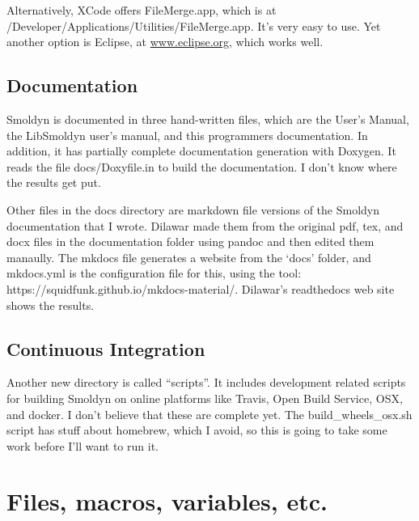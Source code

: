\documentclass {book}
\begin{document}
Alternatively, XCode offers FileMerge.app, which is at /Developer/Applications/Utilities/FileMerge.app. It's very easy to use. Yet another option is Eclipse, at \url{www.eclipse.org}, which works well.

\section{Documentation}

Smoldyn is documented in three hand-written files, which are the User's Manual, the LibSmoldyn user's manual, and this programmers documentation. In addition, it has partially complete documentation generation with Doxygen. It reads the file docs/Doxyfile.in to build the documentation. I don't know where the results get put.

Other files in the docs directory are markdown file versions of the Smoldyn documentation that I wrote. Dilawar made them from the original pdf, tex, and docx files in the documentation folder using pandoc and then edited them manaully. The mkdocs file generates a website from the `docs' folder, and mkdocs.yml is the configuration file for this, using the tool: https://squidfunk.github.io/mkdocs-material/. Dilawar's readthedocs web site shows the results.

\section{Continuous Integration}

Another new directory is called ``scripts''. It includes development related scripts for building Smoldyn on online platforms like Travis, Open Build Service, OSX, and docker. I don't believe that these are complete yet. The build\_wheels\_osx.sh script has stuff about homebrew, which I avoid, so this is going to take some work before I'll want to run it.



\chapter{Files, macros, variables, etc.}
\end{document}
